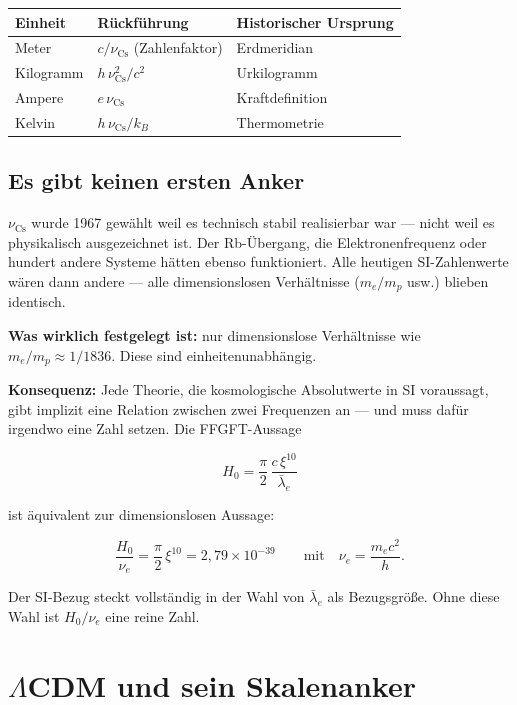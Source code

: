 \documentclass[11pt]{report}
\begin{document}
\begin{center}
\begin{tabular}{lll}
\toprule
Einheit & Rückführung & Historischer Ursprung \\
\midrule
Meter   & $c/\nu_\text{Cs}$ (Zahlenfaktor) & Erdmeridian \\
Kilogramm & $h\,\nu_\text{Cs}^2/c^2$ & Urkilogramm \\
Ampere  & $e\,\nu_\text{Cs}$ & Kraftdefinition \\
Kelvin  & $h\,\nu_\text{Cs}/k_B$ & Thermometrie \\
\bottomrule
\end{tabular}
\end{center}

\section{Es gibt keinen ersten Anker}

$\nu_\text{Cs}$ wurde 1967 gewählt weil es technisch stabil
realisierbar war — nicht weil es physikalisch ausgezeichnet ist.
Der Rb-Übergang, die Elektronenfrequenz oder hundert andere Systeme
hätten ebenso funktioniert. Alle heutigen SI-Zahlenwerte wären dann
andere — alle dimensionslosen Verhältnisse ($m_e/m_p$ usw.) blieben
identisch.

\textbf{Was wirklich festgelegt ist:} nur dimensionslose Verhältnisse
wie $m_e/m_p \approx 1/1836$. Diese sind einheitenunabhängig.

\textbf{Konsequenz:} Jede Theorie, die kosmologische Absolutwerte in SI
voraussagt, gibt implizit eine Relation zwischen zwei Frequenzen an —
und muss dafür irgendwo eine Zahl setzen. Die FFGFT-Aussage

\[
  H_0 = \frac{\pi}{2}\,\frac{c\,\xi^{10}}{\bar\lambda_e}
\]

ist äquivalent zur dimensionslosen Aussage:

\[
  \frac{H_0}{\nu_e} = \frac{\pi}{2}\,\xi^{10} = 2{,}79\times10^{-39}
  \qquad\text{mit}\quad \nu_e = \frac{m_e c^2}{h}.
\]

Der SI-Bezug steckt vollständig in der Wahl von $\bar\lambda_e$ als
Bezugsgröße. Ohne diese Wahl ist $H_0/\nu_e$ eine reine Zahl.

\chapter{$\Lambda$CDM und sein Skalenanker}
\end{document}
